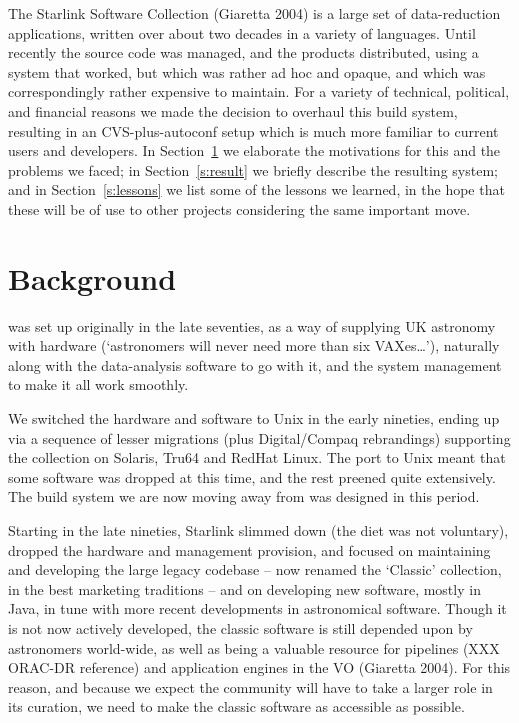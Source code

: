 \documentclass[11pt,twoside]{article}
\begin{document}
The Starlink Software Collection (Giaretta 2004) is a large set of
data-reduction 
applications, written over about two decades in a variety of
languages.  Until recently the source code was managed, and the
products distributed, using a system that worked, but which was
rather ad hoc and opaque, and which was correspondingly rather
expensive to maintain.  For a variety of technical, political, and financial
reasons we made the decision to overhaul this build system, resulting
in an CVS-plus-autoconf setup which is much more familiar to current users and
developers.   In Section~\ref{s:background} we elaborate the
motivations for this and the problems we faced; in
Section~\ref{s:result} we briefly describe the resulting system; and
in Section~\ref{s:lessons} we list some of the lessons we learned, in
the hope that these will be of use to other projects considering the
same important move.


\section{Background}
\label{s:background}


 was set up
originally in the late seventies, as a way of supplying UK astronomy
with hardware (`astronomers will never need more than six
VAXes\dots'), naturally along with the data-analysis software to go
with it, and the system management to make it all work smoothly.

We switched the hardware and software to Unix in the early nineties,
ending up via a sequence of lesser migrations (plus Digital/Compaq
rebrandings) supporting the collection on Solaris, Tru64 and RedHat
Linux.  The port to Unix meant that some software was dropped at this
time, and the rest preened quite extensively.  The build system we are
now moving away from was designed in this period.

Starting in the late nineties, Starlink slimmed down (the diet was not
voluntary), dropped the hardware and management provision, and focused
on maintaining and developing the large legacy codebase -- now renamed
the `Classic' collection, in the best marketing traditions -- and on
developing new software, mostly in Java, in tune with more recent
developments in astronomical software.  Though it is not now actively
developed, the classic software is still depended upon by astronomers
world-wide, as well as being a valuable resource for pipelines (XXX
ORAC-DR reference) and application engines in the VO (Giaretta 2004).
For this reason, and because we expect the community will have to take
a larger role in its curation, we need to make the classic software as
accessible as possible.
\end{document}
